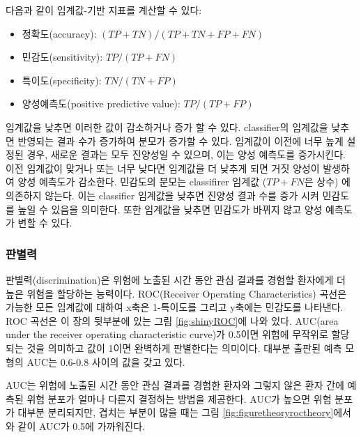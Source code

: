 \documentclass[11pt]{book}
\providecommand{\tightlist}{%
  \setlength{\itemsep}{0pt}\setlength{\parskip}{0pt}}
\theoremstyle{definition}
\theoremstyle{definition}
\theoremstyle{definition}
\theoremstyle{remark}
\begin{document}
다음과 같이 임계값-기반 지표를 계산할 수 있다:

\begin{itemize}
\tightlist
\item
  정확도(accuracy): \((TP+TN)/(TP+TN+FP+FN)\)
\item
  민감도(sensitivity): \(TP/(TP+FN)\)
\item
  특이도(specificity): \(TN/(TN+FP)\)
\item
  양성예측도(positive predictive value): \(TP/(TP+FP)\)
\end{itemize}

임계값을 낮추면 이러한 값이 감소하거나 증가 할 수 있다. classifier의
임계값을 낮추면 반영되는 결과 수가 증가하여 분모가 증가할 수 있다.
임계값이 이전에 너무 높게 설정된 경우, 새로운 결과는 모두 진양성일 수
있으며, 이는 양성 예측도를 증가시킨다. 이전 임계값이 맞거나 또는 너무
낮다면 임계값을 더 낮추게 되면 거짓 양성이 발생하여 양성 예측도가
감소한다. 민감도의 분모는 classifirer 임계값 (\(TP+FN\)은 상수) 에
의존하지 않는다. 이는 classifier 임계값을 낮추면 진양성 결과 수를 증가
시켜 민감도를 높일 수 있음을 의미한다. 또한 임계값을 낮추면 민감도가
바뀌지 않고 양성 예측도가 변할 수 있다.

\subsubsection*{판별력}

판별력(discrimination)은 위험에 노출된 시간 동안 관심 결과를 경험할
환자에게 더 높은 위험을 할당하는 능력이다. ROC(Receiver Operating
Characteristics) 곡선은 가능한 모든 임계값에 대하여 x축은 1-특이도를
그리고 y축에는 민감도를 나타낸다. ROC 곡선은 이 장의 뒷부분에 있는 그림
\ref{fig:shinyROC}에 나와 있다. AUC(area under the receiver operating
characteristic curve)가 0.5이면 위험에 무작위로 할당되는 것을 의미하고
값이 1이면 완벽하게 판별한다는 의미이다. 대부분 출판된 예측 모형의 AUC는
0.6-0.8 사이의 값을 갖고 있다.  

AUC는 위험에 노출된 시간 동안 관심 결과를 경험한 환자와 그렇지 않은 환자
간에 예측된 위험 분포가 얼마나 다른지 결정하는 방법을 제공한다. AUC가
높으면 위험 분포가 대부분 분리되지만, 겹치는 부분이 많을 때는 그림
\ref{fig:figuretheoryroctheory}에서와 같이 AUC가 0.5에 가까워진다.
\end{document}

